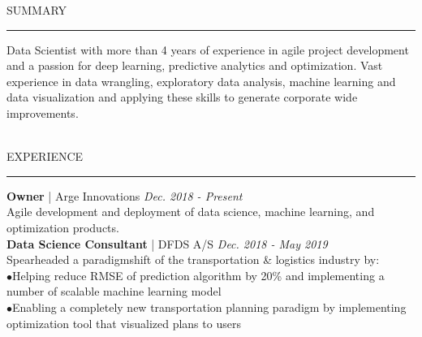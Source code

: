 \documentclass[11pt,a4paper]{article}
\newcommand{\textline}[3]{\normalsize \textbf{#1} | #2 \hfill \textit{#3}}
\newcommand{\headline}[1]{\Large \textcolor{myblue}{#1}}
\newcommand{\accomplishment}[1]{{\hspace*{-9pt}\textcolor{myblue}{$\bullet$}}\hspace*{4pt}\linespread{1.1}\footnotesize#1}
\begin{document}
\vspace{0.2cm}
{\headline{SUMMARY}}
\vspace{0.2cm}
{\color{myblue}\hrule height 0.3mm}
\vspace{0.2cm}
Data Scientist with more than 4 years of experience in agile project development and a passion for deep learning, predictive analytics and optimization. Vast experience in data wrangling, exploratory data analysis, machine learning and data visualization and applying these skills to generate corporate wide improvements.\\
\vspace{0.3cm}
\\
  \begin{minipage}[t]{0.66\linewidth}
    {\headline{EXPERIENCE}}
    \vspace{0.2cm}
    {\color{myblue}\hrule height 0.3mm}
    \vspace{0.2cm}
    \textline{Owner}{Arge Innovations}{{Dec. 2018 - Present}}\\
    \footnotesize Agile development and deployment of data science, machine learning, and optimization products.\\

    \textline{Data Science Consultant}{DFDS A/S}{Dec. 2018 - May 2019}\\
    \footnotesize Spearheaded a paradigmshift of the transportation \& logistics industry by:\\
    \accomplishment{Helping reduce RMSE of prediction algorithm by 20\% and implementing a number of scalable machine learning model}\\
    \accomplishment{Enabling a completely new transportation planning paradigm by implementing optimization tool that visualized plans to users}\\
    \\


\end{minipage}
\end{document}
